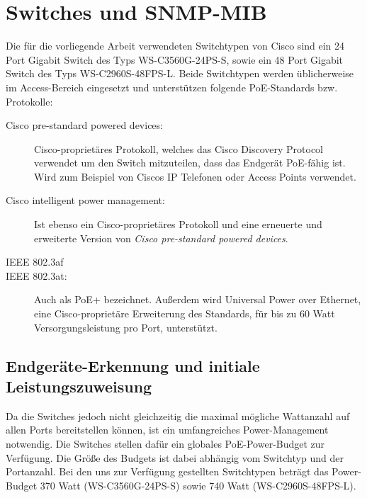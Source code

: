 \section{Switches und SNMP-MIB}
\label{sec:cisco}

Die f\"ur die vorliegende Arbeit verwendeten Switchtypen von Cisco sind ein 24 Port Gigabit Switch des Typs WS-C3560G-24PS-S, sowie ein 48 Port Gigabit Switch des Typs WS-C2960S-48FPS-L. Beide Switchtypen werden \"ublicherweise im Access-Bereich eingesetzt und unterst\"utzen folgende PoE-Standards bzw. Protokolle:
\begin{description}
\item[Cisco pre-standard powered devices:] Cisco-propriet\"ares Protokoll, welches das Cisco Discovery Protocol verwendet um den Switch mitzuteilen, dass das Endger\"at PoE-f\"ahig ist. Wird zum Beispiel von Ciscos IP Telefonen oder Access Points verwendet.
\item[Cisco intelligent power management:] Ist ebenso ein Cisco-propriet\"ares Protokoll und eine erneuerte und erweiterte Version von \emph{Cisco pre-standard powered devices}.
\item[IEEE 802.3af]
\item[IEEE 802.3at:] Auch als PoE+ bezeichnet. Au{\ss}erdem wird Universal Power over Ethernet, eine Cisco-propriet\"are Erweiterung des Standards, f\"ur bis zu 60 Watt Versorgungsleistung pro Port, unterst\"utzt.
\end{description}

\subsection{Endger\"ate-Erkennung und initiale Leistungszuweisung}
Da die Switches jedoch nicht gleichzeitig die maximal m\"ogliche Wattanzahl auf allen Ports bereitstellen k\"onnen, ist ein umfangreiches Power-Management notwendig. Die Switches stellen daf\"ur ein globales PoE-Power-Budget zur Verf\"ugung. Die Gr\"o{\ss}e des Budgets ist dabei abh\"angig vom Switchtyp und der Portanzahl. Bei den uns zur Verf\"ugung gestellten Switchtypen betr\"agt das Power-Budget 370 Watt (WS-C3560G-24PS-S)\cite{cisco-c3560g-datasheet} sowie 740 Watt (WS-C2960S-48FPS-L)\cite{cisco-c2960s-datasheet}.

